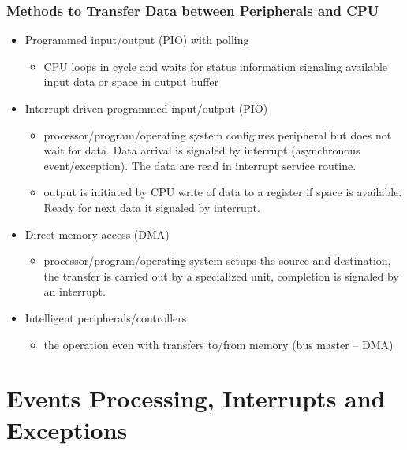 \documentclass{beamer}
\begin{document}
\begin{frame}
\frametitle{Methods to Transfer Data between Peripherals and CPU}

\begin{itemize}
 \item Programmed input/output (PIO) with polling
 \begin{itemize}
  \item CPU loops in cycle and waits for status information signaling
        available input data or space in output buffer
 \end{itemize}
\end{itemize}
\begin{itemize}
 \item Interrupt driven programmed input/output (PIO)
 \begin{itemize}
  \item processor/program/operating system configures peripheral but does not wait
        for data. Data arrival is signaled by interrupt (asynchronous
        event/exception). The data are read in interrupt service
        routine.
  \item output is initiated by CPU write of data to a register if space
        is available. Ready for next data it signaled by interrupt.
 \end{itemize}
\end{itemize}
\begin{itemize}
 \item Direct memory access (DMA)
 \begin{itemize}
  \item processor/program/operating system setups the source and destination,
        the transfer is carried out by a specialized unit, completion is signaled
        by an interrupt.
 \end{itemize}
\end{itemize}
\begin{itemize}
 \item Intelligent peripherals/controllers
 \begin{itemize}
  \item the operation even with transfers to/from memory (bus master -- DMA)
 \end{itemize}
\end{itemize}
\end{frame}

\section{Events Processing, Interrupts and Exceptions}
\end{document}
